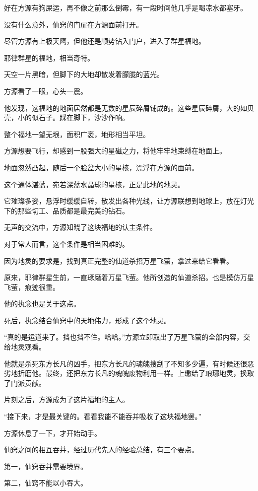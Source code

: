 \begin{this_body}
好在方源有狗屎运，再不像之前那么倒霉，有一段时间他几乎是喝凉水都塞牙。

没有什么意外，仙窍的门扉在方源面前打开。

尽管方源有上极天鹰，但他还是顺势钻入门户，进入了群星福地。

耶律群星的福地，相当奇特。

天空一片黑暗，但脚下的大地却散发着朦胧的蓝光。

方源看了一眼，心头一震。

他发现，这福地的地面居然都是无数的星辰碎屑铺成的。这些星辰碎屑，大的如贝壳，小的似石子。踩在脚下，沙沙作响。

整个福地一望无垠，面积广袤，地形相当平坦。

方源想要飞行，却感到一股强大的星磁之力，将他牢牢地束缚在地面上。

地面忽然凸起，随后一个脸盆大小的星核，漂浮在方源的面前。

这个通体湛蓝，宛若深蓝水晶球的星核，正是此地的地灵。

它璀璨多姿，悬浮时缓缓自转，散发出各种光线，让方源联想到地球上，放在灯光下的那些切工、品质都是最完美的钻石。

无声的交流中，方源知晓了这块福地的认主条件。

对于常人而言，这个条件是相当困难的。

因为地灵的要求是，找到真正完整的仙道杀招万星飞萤，拿过来给它看看。

原来，耶律群星生前，一直琢磨着万星飞萤。他所创造的仙道杀招。也是模仿万星飞萤，痕迹很重。

他的执念也是关于这点。

死后，执念结合仙窍中的天地伟力，形成了这个地灵。

“真的是运道来了。挡也挡不住。哈哈。”方源立即取出了万星飞萤的全部内容，交给地灵观看。

他就是杀死东方长凡的凶手，把东方长凡的魂魄搜刮了不知多少遍，有时候还很恶劣地折磨他。最终，还把东方长凡的魂魄废物利用一样。上缴给了琅琊地灵，换取了门派贡献。

片刻之后，方源成为了这片福地的主人。

“接下来，才是最关键的。看看我能不能吞并吸收了这块福地罢。”

方源休息了一下，才开始动手。

仙窍之间的相互吞并，经过历代先人的经验总结，有三个要点。

第一，仙窍吞并需要境界。

第二，仙窍不能以小吞大。


\end{this_body}
